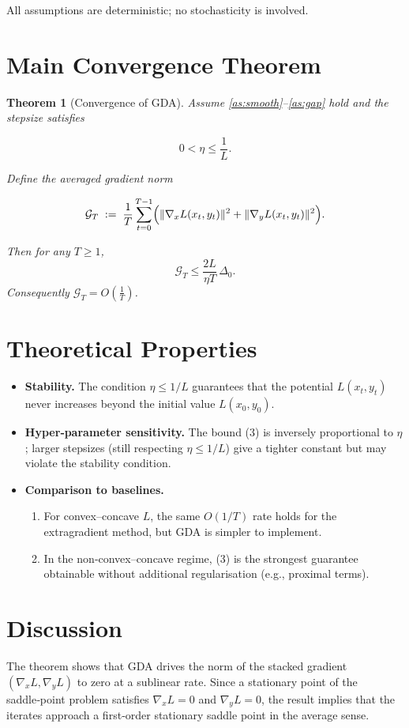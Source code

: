 \documentclass{article}
\newtheorem{theorem}{Theorem}
\begin{document}
All assumptions are deterministic; no stochasticity is involved.

\section*{Main Convergence Theorem}
\begin{theorem}[Convergence of GDA]\label{thm:main}
Assume \ref{as:smooth}--\ref{as:gap} hold and the stepsize satisfies  

\[
0<\eta\le \frac{1}{L}.
\]

Define the averaged gradient norm  

\[
\mathcal{G}_T \;:=\; \frac{1}{T}\sum_{t=0}^{T-1}
\Bigl(\|\nabla_x L(x_t,y_t)\|^{2}+\|\nabla_y L(x_t,y_t)\|^{2}\Bigr).
\]

Then for any $T\ge1$,
\[
\boxed{\;
\mathcal{G}_T \le \frac{2L}{\eta T}\,\Delta_0 .
\;}
\tag{3}
\]
Consequently $\mathcal{G}_T = O\!\left(\frac{1}{T}\right)$.
\end{theorem}

\section*{Theoretical Properties}
\begin{itemize}[leftmargin=*]
\item \textbf{Stability.} The condition $\eta\le 1/L$ guarantees that the
potential $L(x_t,y_t)$ never increases beyond the initial value $L(x_0,y_0)$.
\item \textbf{Hyper‑parameter sensitivity.} The bound (3) is inversely
proportional to $\eta$; larger stepsizes (still respecting $\eta\le1/L$) give a
tighter constant but may violate the stability condition.
\item \textbf{Comparison to baselines.}
    \begin{enumerate}
        \item For convex–concave $L$, the same $O(1/T)$ rate holds for the
        extragradient method, but GDA is simpler to implement.
        \item In the non‑convex–concave regime, (3) is the strongest guarantee
        obtainable without additional regularisation (e.g., proximal terms).
    \end{enumerate}
\end{itemize}

\section*{Discussion}
The theorem shows that GDA drives the norm of the stacked gradient
$(\nabla_x L,\nabla_y L)$ to zero at a sublinear rate.  Since a stationary point of
the saddle‑point problem satisfies $\nabla_x L=0$ and $\nabla_y L=0$, the result
implies that the iterates approach a first‑order stationary saddle point in the
average sense.
\end{document}
